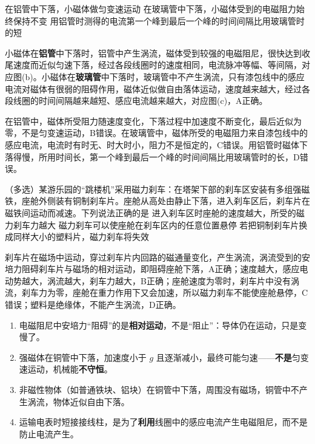 \begin{liti}
\begin{center}
\end{center}
%
{在铝管中下落，小磁体做匀变速运动}%
{在玻璃管中下落，小磁体受到的电磁阻力始终保持不变}%
{用铝管时测得的电流第一个峰到最后一个峰的时间间隔比用玻璃管时的短}
\begin{jiexi}[3cm]
小磁体在\textbf{铝管}中下落时，铝管中产生涡流，磁体受到较强的电磁阻尼，很快达到收尾速度而近似匀速下落，经过各段线圈时的速度相同，电流脉冲等幅、等间隔，对应图(b)。小磁体在\textbf{玻璃管}中下落时，玻璃管中不产生涡流，只有漆包线中的感应电流对磁体有很弱的阻碍作用，磁体近似做自由落体运动，速度越来越大，经过各段线圈的时间间隔越来越短、感应电流越来越大，对应图(c)，A正确。

在铝管中，磁体所受阻力随速度变化，下落过程中加速度不断变化，最后近似为零，不是匀变速运动，B错误。在玻璃管中，磁体所受的电磁阻力来自漆包线中的感应电流，电流时有时无、时大时小，阻力不是恒定的，C错误。用铝管时磁体下落得慢，所用时间长，第一个峰到最后一个峰的时间间隔比用玻璃管时的长，D错误。
\end{jiexi}
\end{liti}

\begin{liti}
（多选）某游乐园的“跳楼机”采用磁力刹车：在塔架下部的刹车区安装有多组强磁铁，座舱外侧装有铜制刹车片。座舱从高处由静止下落，进入刹车区后，刹车片在磁铁间运动而减速。下列说法正确的是
%
{进入刹车区时座舱的速度越大，所受的磁力刹车力越大}%
{磁力刹车可以使座舱在刹车区内的任意位置悬停}%
{若把铜制刹车片换成同样大小的塑料片，磁力刹车将失效}
\begin{jiexi}[2cm]
刹车片在磁场中运动，穿过刹车片内回路的磁通量变化，产生涡流，涡流受到的安培力阻碍刹车片与磁场的相对运动，即阻碍座舱下落，A正确；速度越大，感应电动势越大，涡流越大，刹车力越大，B正确；座舱速度为零时，刹车片中没有涡流，刹车力为零，座舱在重力作用下又会加速，所以磁力刹车不能使座舱悬停，C错误；塑料是绝缘体，不能产生涡流，D正确。
\end{jiexi}
\end{liti}

\begin{yicuo}
\begin{enumerate}[label=（\arabic*）,leftmargin=2.4em]
  \item 电磁阻尼中安培力“阻碍”的是\textbf{相对运动}，不是“阻止”：导体仍在运动，只是变慢了。
  \item 强磁体在铜管中下落，加速度小于 $g$ 且逐渐减小，最终可能匀速——\textbf{不是}匀变速运动，机械能\textbf{不守恒}。
  \item 非磁性物体（如普通铁块、铝块）在铜管中下落，周围没有磁场，铜管中不产生涡流，物体近似自由下落。
  \item 运输电表时短接接线柱，是为了\textbf{利用}线圈中的感应电流产生电磁阻尼，而不是防止电流产生。
\end{enumerate}
\end{yicuo}
